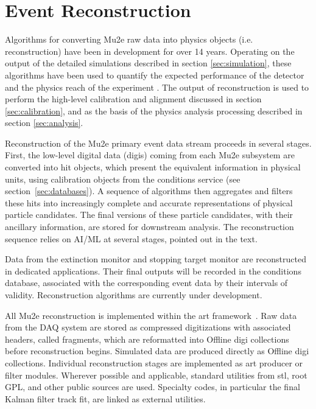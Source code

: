 \section{Event Reconstruction}
\label{sec:reconstruction}

Algorithms for converting Mu2e raw data into physics objects (i.e. reconstruction) have been in development for over 14 years. Operating on the output of the detailed simulations described in section \ref{sec:simulation}, these algorithms have been used to quantify the expected performance of the detector \cite{TDR} and the physics reach of the experiment \cite{Mu2e:2022ggl}. The output of reconstruction is used to perform the high-level calibration and alignment discussed in section \ref{sec:calibration}, and as the basis of the physics analysis processing described in section \ref{sec:analysis}. 

Reconstruction of the Mu2e primary event data stream proceeds in several stages. First, the low-level digital data (digis) coming from each Mu2e subsystem are converted into hit objects, which present the equivalent information in physical units, using calibration objects from the conditions service (see section~\ref{sec:databases}). A sequence of algorithms then aggregates and filters these hits into increasingly complete and accurate representations of physical particle candidates. The final versions of these particle candidates, with their ancillary information, are stored for downstream analysis. The reconstruction sequence relies on AI/ML at several stages, pointed out in the text.

Data from the extinction monitor and stopping target monitor are reconstructed in dedicated applications. Their final outputs will be recorded in the conditions database, associated with the corresponding event data by their intervals of validity. Reconstruction algorithms are currently under development.

All Mu2e reconstruction is implemented within the art framework~\cite{Green:2012gv}. Raw data from the DAQ system are stored as compressed digitizations with associated headers, called fragments, which are reformatted into Offline digi collections before reconstruction begins. Simulated data are produced directly as Offline digi collections. Individual reconstruction stages are implemented as art producer or filter modules. Wherever possible and applicable, standard utilities from stl, root GPL, and other public sources are used. Specialty codes, in particular the final Kalman filter track fit, are linked as external utilities.

